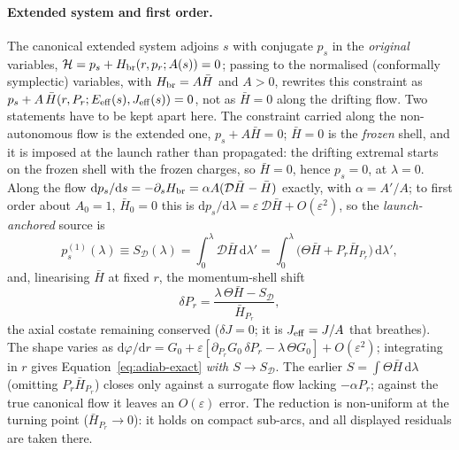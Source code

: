 \documentclass[12pt]{iopart}
\theoremstyle{plain}
\theoremstyle{definition}
\theoremstyle{remark}
\newcommand{\dd}{\mathrm{d}}
\begin{document}
\paragraph{Extended system and first order.} The canonical extended system adjoins $s$
with conjugate $p_s$ in the \emph{original} variables,
$\mathcal H=p_s+H_{\rm br}(r,p_r;A(s))=0$; passing to the normalised (conformally
symplectic) variables, with $H_{\rm br}=A\bar H$ and $A>0$, rewrites this constraint as
$p_s+A\,\bar H(r,P_r;E_{\rm eff}(s),J_{\rm eff}(s))=0$, not as $\bar H=0$ along the
drifting flow. Two statements have to be kept apart here.
The constraint carried along the non-autonomous flow is the extended one,
$p_s+A\bar H=0$; $\bar H=0$ is the \emph{frozen} shell, and it is imposed at the
launch rather than propagated: the drifting extremal starts on the frozen shell with the
frozen charges, so $\bar H=0$, hence $p_s=0$, at $\lambda=0$. Along the flow
$\dd p_s/\dd s=-\partial_s H_{\rm br}=\alpha A(\mathcal D\bar H-\bar H)$ exactly, with
$\alpha=A'/A$; to first order about $A_0=1$, $\bar H_0=0$ this is
$\dd p_s/\dd\lambda=\varepsilon\,\mathcal D\bar H+O(\varepsilon^2)$, so the \emph{launch-anchored}
source is
\begin{equation}
    p_s^{(1)}(\lambda)\equiv S_{\mathcal D}(\lambda)
    =\int_0^{\lambda}\mathcal D\bar H\,\dd\lambda'
    =\int_0^{\lambda}\big(\Theta\bar H+P_r\bar H_{P_r}\big)\,\dd\lambda',
    \label{eq:pS-app}
\end{equation}
and, linearising $\bar H$ at fixed $r$, the momentum-shell shift
\begin{equation}
    \delta P_r=\frac{\lambda\,\Theta\bar H-S_{\mathcal D}}{\bar H_{P_r}},
    \label{eq:dpr-app}
\end{equation}
the axial costate remaining conserved ($\delta J=0$; it is $J_{\rm eff}=J/A$ that
breathes). The shape varies as $\dd\varphi/\dd r=G_0+\varepsilon[\partial_{P_r}G_0\,\delta
P_r-\lambda\,\Theta G_0]+O(\varepsilon^2)$; integrating in $r$ gives
Equation~\eqref{eq:adiab-exact} \emph{with $S\to S_{\mathcal D}$}. The earlier $S=\int\Theta\bar
H\,\dd\lambda$ (omitting $P_r\bar H_{P_r}$) closes only against a surrogate flow lacking
$-\alpha P_r$; against the true canonical flow it leaves an $O(\varepsilon)$ error. The
reduction is non-uniform at the turning point ($\bar H_{P_r}\to0$): it holds on compact
sub-arcs, and all displayed residuals are taken there.
\end{document}
